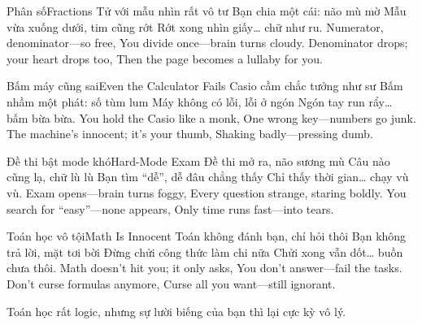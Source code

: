 \begin{tutuyetbox}{Phân số}{Fractions}
Tử với mẫu nhìn rất vô tư
Bạn chia một cái: não mù mờ
Mẫu vừa xuống dưới, tim cũng rớt
Rớt xong nhìn giấy… chữ như ru.
\tcblower
Numerator, denominator—so free,
You divide once—brain turns cloudy.
Denominator drops; your heart drops too,
Then the page becomes a lullaby for you.
\end{tutuyetbox}

\begin{tutuyetbox}{Bấm máy cũng sai}{Even the Calculator Fails}
Casio cầm chắc tưởng như sư
Bấm nhầm một phát: số tùm lum
Máy không có lỗi, lỗi ở ngón
Ngón tay run rẩy… bấm bừa bừa.
\tcblower
You hold the Casio like a monk,
One wrong key—numbers go junk.
The machine’s innocent; it’s your thumb,
Shaking badly—pressing dumb.
\end{tutuyetbox}

\begin{tutuyetbox}{Đề thi bật mode khó}{Hard-Mode Exam}
Đề thi mở ra, não sương mù
Câu nào cũng lạ, chữ lù lù
Bạn tìm “dễ”, dễ đâu chẳng thấy
Chỉ thấy thời gian… chạy vù vù.
\tcblower
Exam opens—brain turns foggy,
Every question strange, staring boldly.
You search for “easy”—none appears,
Only time runs fast—into tears.
\end{tutuyetbox}

\begin{tutuyetbox}{Toán học vô tội}{Math Is Innocent}
Toán không đánh bạn, chỉ hỏi thôi
Bạn không trả lời, mặt tơi bời
Đừng chửi công thức làm chi nữa
Chửi xong vẫn dốt… buồn chưa thôi.
\tcblower
Math doesn’t hit you; it only asks,
You don’t answer—fail the tasks.
Don’t curse formulas anymore,
Curse all you want—still ignorant.
\end{tutuyetbox}

\begin{ghichu}
Toán học rất logic, nhưng sự lười biếng của bạn thì lại cực kỳ vô lý.
\end{ghichu}